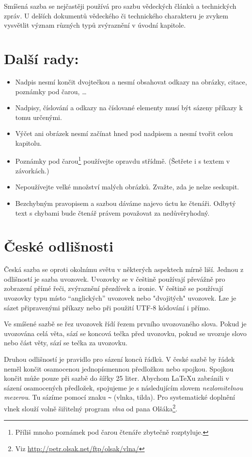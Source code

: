 \documentclass[hidelinks,10pt,a4paper,twocolumn]{article}
\begin{document}
	Smíšená sazba se nejčastěji používá pro sazbu vědeckých článků a technických zpráv. U delších dokumentů vědeckého či technického charakteru je zvykem vysvětlit význam různých typů zvýraznění v úvodní kapitole.
	
	\section{Další rady:}
	\label{sec:dalsirady}
	\begin{itemize}
		\setlength\itemsep{0.102em}
		\item Nadpis nesmí končit dvojtečkou a nesmí obsahovat odkazy na obrázky, citace, poznámky pod čarou, \dots
		\item Nadpisy, číslování a odkazy na číslované elementy musí být sázeny příkazy k tomu určenými.
		\item 	Výčet ani obrázek nesmí začínat hned pod nadpisem a nesmí tvořit celou kapitolu.
		\item 	Poznámky pod čarou\footnote{Příliš mnoho poznámek pod čarou čtenáře zbytečně rozptyluje.} používejte opravdu střídmě. (Šetřete i s textem v závorkách.)
		\item Nepoužívejte velké množství malých obrázků. Zvažte, zda je nelze seskupit.
		\item Bezchybným pravopisem a sazbou dáváme najevo úctu ke čtenáři. Odbytý text s chybami bude čtenář právem považovat za nedůvěryhodný.
		\end{itemize}
	
	\section{České odlišnosti}
	
	Česká sazba se oproti okolnímu světu v některých aspektech mírně liší. Jednou z odlišností je sazba uvozovek. Uvozovky se v češtině používají převážně pro zobrazení přímé řeči, zvýraznění přezdívek a ironie. V češtině se používají uvozovky typu  místo “anglických”  uvozovek nebo "dvojitých" uvozovek. Lze je sázet připravenými příkazy nebo při použití UTF-8 kódování i přímo.
	
	Ve smíšené sazbě se řez uvozovek řídí řezem prvního uvozovaného slova. Pokud je uvozována celá věta, sází se koncová tečka před uvozovku, pokud se uvozuje slovo nebo část věty, sází se tečka za uvozovku.
	
	Druhou odlišností je pravidlo pro sázení konců řádků. V české sazbě by řádek neměl končit osamocenou jednopísmennou předložkou nebo spojkou. Spojkou  končit může pouze při sazbě do šířky 25 liter. Abychom \LaTeX u zabránili v sázení osamocených předložek, spojujeme je s následujícím slovem \emph{nezlomitelnou mezerou}. Tu sázíme pomocí znaku \verb|~| (vlnka, tilda). Pro systematické doplnění vlnek slouží volně šiřitelný program \emph{vlna} od pana Olšáka\footnote{Viz \url{http://petr.olsak.net/ftp/olsak/vlna/} }.
	
\end{document}
